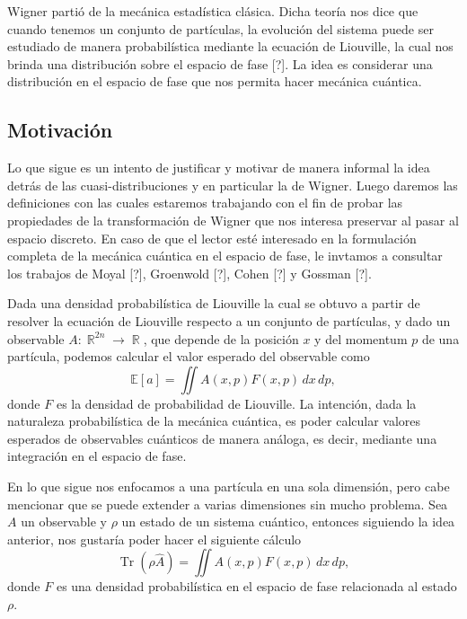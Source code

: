 \documentclass[a4paper]{report}
\DeclareMathOperator{\R}{\mathbb{R}}
\DeclareMathOperator{\Tr}{Tr}
\begin{document}
  Wigner partió de la mecánica estadística clásica. Dicha
  teoría nos dice que cuando tenemos un conjunto de
  partículas, la evolución del sistema puede ser estudiado
  de manera probabilística mediante la ecuación de
  Liouville, la cual nos brinda una distribución sobre el
  espacio de fase [?]. La idea es considerar una
  distribución en el espacio de fase que nos permita hacer
  mecánica cuántica.

  \subsection{Motivación}

  Lo que sigue es un intento de justificar y motivar de
  manera informal la idea detrás de las cuasi-distribuciones
  y en particular la de Wigner. Luego daremos las
  definiciones con las cuales estaremos trabajando con el
  fin de probar las propiedades de la transformación de
  Wigner que nos interesa preservar al pasar al espacio
  discreto. En caso de que el lector esté interesado en la
  formulación completa de la mecánica cuántica en el espacio
  de fase, le invtamos a consultar los trabajos de Moyal
  [?], Groenwold [?], Cohen [?] y Gossman [?].

  Dada una densidad probabilística de Liouville la cual se
  obtuvo a partir de resolver la ecuación de Liouville
  respecto a un conjunto de partículas, y dado un observable
  $A : \R^{2n} \to \R$, que depende de la posición $x$ y del
  momentum $p$ de una partícula, podemos calcular el valor
  esperado del observable como
  \begin{equation}
    \mathbb E[a]
    = \iint A(x,p) F(x,p) \, dx \, dp,
  \end{equation}
  donde $F$ es la densidad de probabilidad de Liouville. La
  intención, dada la naturaleza probabilística de la mecánica
  cuántica, es poder calcular valores esperados
  de observables cuánticos de manera análoga, es decir,
  mediante una integración en el espacio de fase. 

  En lo que sigue nos enfocamos a una partícula en una sola
  dimensión, pero cabe mencionar que se puede extender a
  varias dimensiones sin mucho problema. Sea $A$ un
  observable y $\rho$ un estado de un sistema cuántico,
  entonces siguiendo la idea anterior, nos gustaría poder
  hacer el siguiente cálculo
  \begin{equation}
    \Tr\left(\rho \hat{A}\right)
    = \iint A(x,p)F(x,p) \, dx \, dp,
  \end{equation}
  donde $F$ es una densidad probabilística en el espacio de
  fase relacionada al estado $\rho$.
\end{document}
